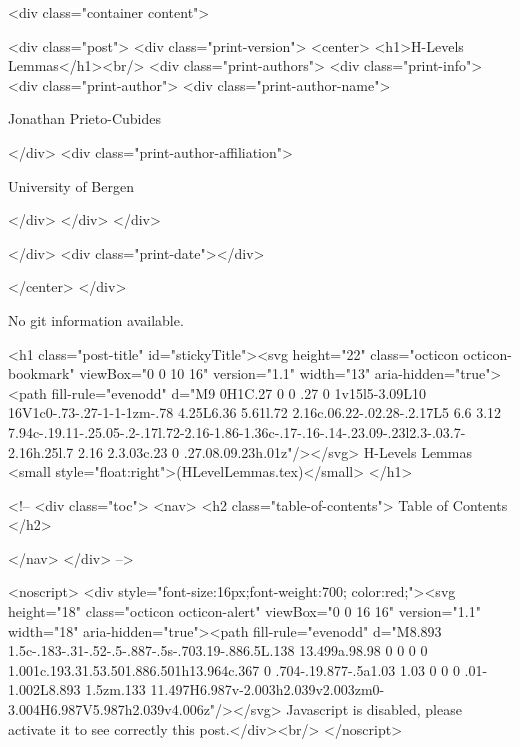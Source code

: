       <div class="container content">
        







<div class="post">
  <div class="print-version">
    <center>
      <h1>H-Levels Lemmas</h1><br/>
        <div class="print-authors">
          <div class="print-info">
            <div class="print-author">
              <div class="print-author-name">
                
                  Jonathan Prieto-Cubides
                
              </div>
              <div class="print-author-affiliation">
                
                  University of Bergen
                
                </div>
            </div>
          </div>
          
          
        </div>
        <div class="print-date"></div>
        
        
    </center>
  </div>

  
  No git information available.
  

  <h1 class="post-title" id="stickyTitle"><svg height="22" class="octicon octicon-bookmark" viewBox="0 0 10 16" version="1.1" width="13" aria-hidden="true"><path fill-rule="evenodd" d="M9 0H1C.27 0 0 .27 0 1v15l5-3.09L10 16V1c0-.73-.27-1-1-1zm-.78 4.25L6.36 5.61l.72 2.16c.06.22-.02.28-.2.17L5 6.6 3.12 7.94c-.19.11-.25.05-.2-.17l.72-2.16-1.86-1.36c-.17-.16-.14-.23.09-.23l2.3-.03.7-2.16h.25l.7 2.16 2.3.03c.23 0 .27.08.09.23h.01z"/></svg> H-Levels Lemmas <small style="float:right">(HLevelLemmas.tex)</small>
  </h1>

  <!-- 
  <div class="toc">
    <nav>
    <h2 class="table-of-contents"> Table of Contents </h2>
      

    </nav>
  </div>
   -->

  <noscript>
  <div style="font-size:16px;font-weight:700; color:red;"><svg height="18" class="octicon octicon-alert" viewBox="0 0 16 16" version="1.1" width="18" aria-hidden="true"><path fill-rule="evenodd" d="M8.893 1.5c-.183-.31-.52-.5-.887-.5s-.703.19-.886.5L.138 13.499a.98.98 0 0 0 0 1.001c.193.31.53.501.886.501h13.964c.367 0 .704-.19.877-.5a1.03 1.03 0 0 0 .01-1.002L8.893 1.5zm.133 11.497H6.987v-2.003h2.039v2.003zm0-3.004H6.987V5.987h2.039v4.006z"/></svg> Javascript is disabled, please activate it to see correctly this post.</div><br/>
  </noscript>

